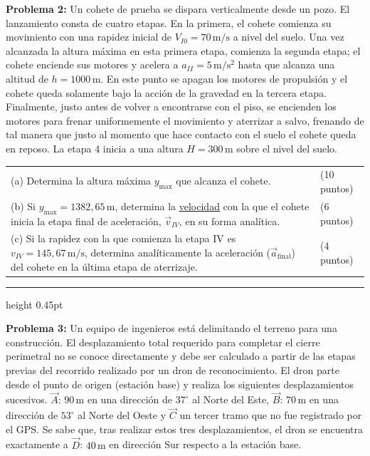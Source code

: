 \documentclass[9pt]{article}
\newcommand{\problem}[1]{\textbf{Problema #1:}}
\newcommand{\vect}[1]{\vec{#1}}
\newcommand{\tightline}{\vspace{0.55mm}\hrule height 0.45pt\vspace{0.75mm}}
\begin{document}
\justifying
\problem{2} Un cohete de prueba se dispara verticalmente desde un pozo. El lanzamiento consta de cuatro etapas. En la primera, el cohete comienza su movimiento con una rapidez inicial de $V_{I0}=70\,\mathrm{m/s}$ a nivel del suelo. Una vez alcanzada la altura máxima en esta primera etapa, comienza la segunda etapa; el cohete enciende sus motores y acelera a $a_{II}=5\,\mathrm{m/s^2}$ hasta que alcanza una altitud de $h=1000\,\mathrm{m}$. En este punto se apagan los motores de propulsión y el cohete queda solamente bajo la acción de la gravedad en la tercera etapa. Finalmente, justo antes de volver a encontrarse con el piso, se encienden los motores para frenar uniformemente el movimiento y aterrizar a salvo, frenando de tal manera que justo al momento que hace contacto con el suelo el cohete queda en reposo. La etapa 4 inicia a una altura $H=300\,\mathrm{m}$ sobre el nivel del suelo.

\vspace{0.5mm}
\begin{tabularx}{\textwidth}{@{}>{\raggedright\arraybackslash}X>{\raggedleft\arraybackslash}p{25mm}@{}}
(a) Determina la altura máxima $y_{\max}$ que alcanza el cohete. & (10 puntos)\\[-0.15mm]
(b) Si $y_{\max}=1382{,}65\,\mathrm{m}$, determina la \underline{velocidad} con la que el cohete inicia la etapa final de aceleración, $\vect{v}_{IV}$, en su forma analítica. & (6 puntos)\\[-0.15mm]
(c) Si la rapidez con la que comienza la etapa IV es $v_{IV}=145{,}67\,\mathrm{m/s}$, determina analíticamente la aceleración ($\vect{a}_{\mathrm{final}}$) del cohete en la última etapa de aterrizaje. & (4 puntos)
\end{tabularx}
\tightline

\justifying
\problem{3} Un equipo de ingenieros está delimitando el terreno para una construcción. El desplazamiento total requerido para completar el cierre perimetral no se conoce directamente y debe ser calculado a partir de las etapas previas del recorrido realizado por un dron de reconocimiento. El dron parte desde el punto de origen (estación base) y realiza los siguientes desplazamientos sucesivos. $\vect{A}$: $90\,\mathrm{m}$ en una dirección de $37^{\circ}$ al Norte del Este, $\vect{B}$: $70\,\mathrm{m}$ en una dirección de $53^{\circ}$ al Norte del Oeste y $\vect{C}$ un tercer tramo que no fue registrado por el GPS. Se sabe que, tras realizar estos tres desplazamientos, el dron se encuentra exactamente a $\vect{D}$: $40\,\mathrm{m}$ en dirección Sur respecto a la estación base.
\end{document}
